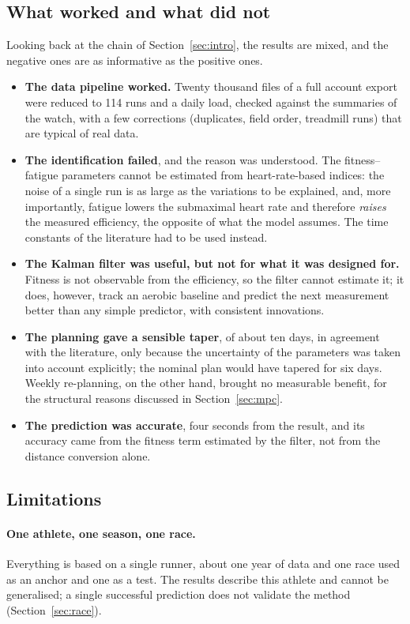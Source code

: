 \documentclass[11pt,a4paper]{article}
\begin{document}
\subsection{What worked and what did not}
Looking back at the chain of Section~\ref{sec:intro}, the results are mixed, and
the negative ones are as informative as the positive ones.
\begin{itemize}
\item \textbf{The data pipeline worked.} Twenty thousand files of a full account
export were reduced to 114 runs and a daily load, checked against the summaries
of the watch, with a few corrections (duplicates, field order, treadmill runs)
that are typical of real data.
\item \textbf{The identification failed}, and the reason was understood. The
fitness--fatigue parameters cannot be estimated from heart-rate-based indices:
the noise of a single run is as large as the variations to be explained, and,
more importantly, fatigue lowers the submaximal heart rate and therefore
\emph{raises} the measured efficiency, the opposite of what the model assumes.
The time constants of the literature had to be used instead.
\item \textbf{The Kalman filter was useful, but not for what it was designed
for.} Fitness is not observable from the efficiency, so the filter cannot
estimate it; it does, however, track an aerobic baseline and predict the next
measurement better than any simple predictor, with consistent innovations.
\item \textbf{The planning gave a sensible taper}, of about ten days, in agreement
with the literature, only because the uncertainty of the parameters was taken
into account explicitly; the nominal plan would have tapered for six days. Weekly
re-planning, on the other hand, brought no measurable benefit, for the
structural reasons discussed in Section~\ref{sec:mpc}.
\item \textbf{The prediction was accurate}, four seconds from the result, and its
accuracy came from the fitness term estimated by the filter, not from the
distance conversion alone.
\end{itemize}

\subsection{Limitations}
\paragraph{One athlete, one season, one race.} Everything is based on a single
runner, about one year of data and one race used as an anchor and one as a
test. The results describe this athlete and cannot be generalised; a single
successful prediction does not validate the method (Section~\ref{sec:race}).
\end{document}
